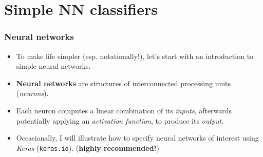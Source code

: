 \documentclass{beamer}
\begin{document}
\section{Simple NN classifiers}

\begin{frame}
	\frametitle{Neural networks}
	\begin{itemize}
		\item To make life simpler (esp. notationally!), let's start with an introduction to simple neural networks.
		\vfill
		\item \textbf{Neural networks} are structures of interconnected processing units (\emph{neurons}).	
		\vfill
		\item Each neuron computes a linear combination of its \emph{inputs}, afterwards potentially applying an \emph{activation function}, to produce its \emph{output}.
		\vfill
		\item Occasionally, I will illustrate how to specify neural networks of interest using \emph{Keras} ({\tt keras.io}). (\textbf{highly recommended!})
	\end{itemize}
\end{frame}
\end{document}

